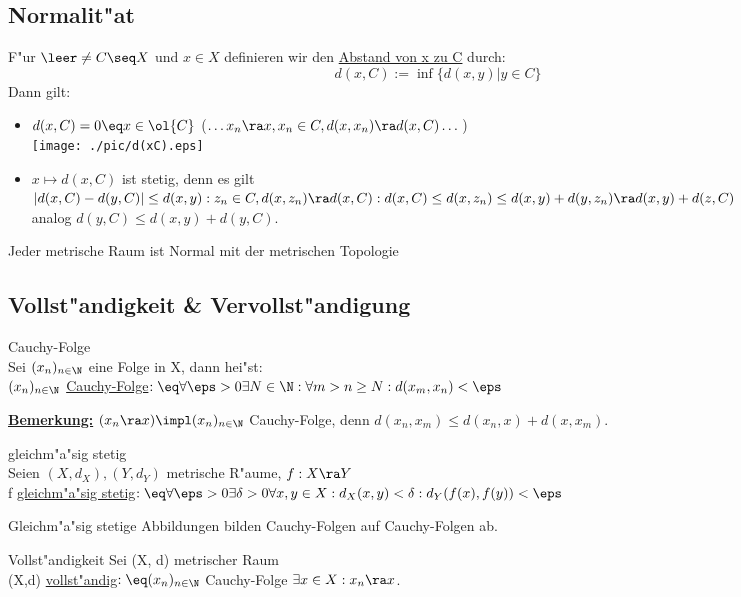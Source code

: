 \subsection{Normalit"at}
F"ur $\leer \neq C\seq X$ und $x\in X$ definieren wir den \ul{Abstand von x zu C} durch:
$$d(x,C):=\inf\{d(x,y)|y\in C\}$$
Dann gilt:
\begin{itemize}
\item $d(x,C)=0\eq x\in\ol{C}$ ($\dots x_n\ra x, x_n\in C, d(x,x_n)\ra d(x,C)\dots$)\\
\texttt{[image: ./pic/d(xC).eps]}
\item $x\mapsto d(x,C)$ ist stetig, denn es gilt $|d(x,C) -d(y,C)|\leq d(x,y):\\
z_n\in C, d(x,z_n)\ra d(x,C): d(x,C)\leq d(x,z_n)\leq d(x,y)+d(y,z_n)\ra d(x,y)+d(z,C)$\\
analog $d(y,C)\leq d(x,y)+d(y,C)$.
\end{itemize}

\begin{satz}\label{8.1}{\sc Jeder metrische Raum ist Normal}{ mit der metrischen Topologie}
\end{satz}

\subsection{Vollst"andigkeit \& Vervollst"andigung}
\begin{definition}\label{8.2} Cauchy-Folge \\
Sei $(x_n)_{n\in\N}$ eine Folge in X, dann hei"st:\\
$(x_n)_{n\in\N}$ \ul{Cauchy-Folge}$:\eq \forall\eps >0 \exists N\in\N :\forall m>n\geq N: d(x_m,x_n)<\eps$
\end{definition}
\ul{\bf Bemerkung:} $(x_n\ra x)\impl (x_n)_{n\in\N}$ Cauchy-Folge, denn $d(x_n,x_m)\leq d(x_n, x)+d(x,x_m)$.

\begin{definition}\label{8.3} gleichm"a"sig stetig \\
Seien $(X,d_X), (Y,d_Y)$ metrische R"aume, $f:X\ra Y$\\
f \ul{gleichm"a"sig stetig}$:\eq \forall\eps >0 \exists\delta >0\forall x,y\in X: d_X(x,y)<\delta :d_Y(f(x),f(y))<\eps$
\end{definition}
Gleichm"a"sig stetige Abbildungen bilden Cauchy-Folgen auf Cauchy-Folgen ab.
\begin{definition}\label{8.4} Vollst"andigkeit 
Sei (X, d) metrischer Raum\\
(X,d) \ul{vollst"andig}$:\eq (x_n)_{n\in\N}$ Cauchy-Folge $\exists x\in X: x_n\ra x$.
\end{definition}

